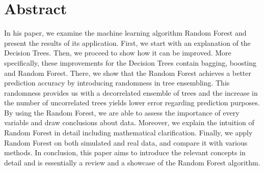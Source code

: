 \section*{Abstract}
\thispagestyle{empty}
In his paper, we examine the machine learning algorithm Random Forest 
and present the results of its application. 
First, we start with an explanation of the Decision Trees. 
Then, we proceed to show how it can be improved.
More specifically, these improvements for the Decision Trees contain bagging, boosting and Random Forest.
There, we show that the Random Forest achieves a better prediction accuracy
by introducing randomness in tree ensembling.
This randomness provides us with a decorrelated ensemble of trees and 
the increase in the number of uncorrelated trees yields lower error regarding prediction purposes. By using the Random Forest, we are able to assess the importance of every variable 
and draw conclusions about data.
Moreover, we explain the intuition of Random Forest in detail including mathematical clarification.
Finally, we apply Random Forest on both simulated and real data, and compare it with various methods. 
In conclusion, this paper aims to introduce the relevant concepts in detail and is essentially a review
and a showcase of the Random Forest algorithm. 




